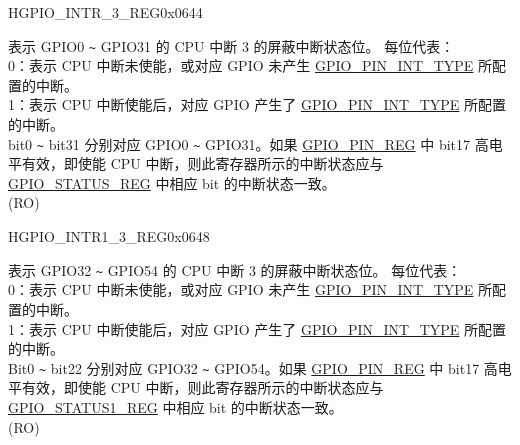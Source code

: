 \begin{register}{H}{GPIO\_INTR\_3\_REG}{0x0644}\label{regdesc:GPIOINTR3REG}
%
\regnewline%
\begin{regdesc}\begin{reglist}
\label{fielddesc:GPIOINT3}\item [GPIO\_INT\_3] 表示 GPIO0 \verb+~+ GPIO31 的 CPU 中断 3 的屏蔽中断状态位。 每位代表：\\
 0：表示 CPU 中断未使能，或对应 GPIO 未产生  \hyperref[fielddesc:GPIOPINNINTTYPE]{GPIO\_PIN\_INT\_TYPE} 所配置的中断。\\
1：表示 CPU 中断使能后，对应 GPIO 产生了  \hyperref[fielddesc:GPIOPINNINTTYPE]{GPIO\_PIN\_INT\_TYPE} 所配置的中断。\\
bit0 \verb+~+ bit31 分别对应 GPIO0 \verb+~+ GPIO31。如果  \hyperref[regdesc:GPIOPINNREG]{GPIO\_PIN\_REG} 中 bit17 高电平有效，即使能 CPU 中断，则此寄存器所示的中断状态应与  \hyperref[regdesc:GPIOSTATUSREG]{GPIO\_STATUS\_REG} 中相应 bit 的中断状态一致。\\
(RO)
\end{reglist}\end{regdesc}
\end{register}


\begin{register}{H}{GPIO\_INTR1\_3\_REG}{0x0648}\label{regdesc:GPIOINTR13REG}
%
%
\regnewline%
\begin{regdesc}\begin{reglist}
\label{fielddesc:GPIOINT13}\item [GPIO\_INT1\_3] 表示 GPIO32 \verb+~+ GPIO54 的 CPU 中断 3 的屏蔽中断状态位。 每位代表：\\
 0：表示 CPU 中断未使能，或对应 GPIO 未产生  \hyperref[fielddesc:GPIOPINNINTTYPE]{GPIO\_PIN\_INT\_TYPE} 所配置的中断。\\
1：表示 CPU 中断使能后，对应 GPIO 产生了  \hyperref[fielddesc:GPIOPINNINTTYPE]{GPIO\_PIN\_INT\_TYPE} 所配置的中断。\\
Bit0 \verb+~+ bit22 分别对应 GPIO32 \verb+~+ GPIO54。如果  \hyperref[regdesc:GPIOPINNREG]{GPIO\_PIN\_REG} 中 bit17 高电平有效，即使能 CPU 中断，则此寄存器所示的中断状态应与  \hyperref[regdesc:GPIOSTATUS1REG]{GPIO\_STATUS1\_REG} 中相应 bit 的中断状态一致。\\
(RO)
\end{reglist}\end{regdesc}
\end{register}


